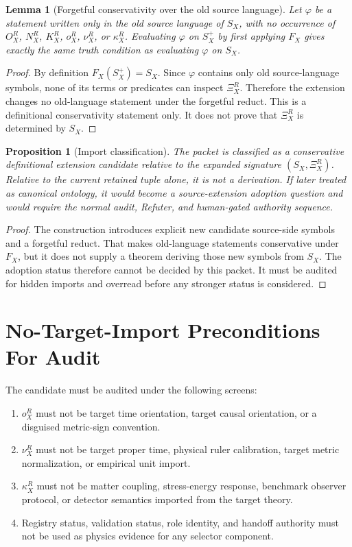 \documentclass[11pt]{article}
\newcommand{\XiR}{\Xi_X^R}
\newcommand{\SX}{S_X}
\newcommand{\Splus}{S_X^+}
\newtheorem{lemma}{Lemma}
\newtheorem{proposition}{Proposition}
\begin{document}
\begin{lemma}[Forgetful conservativity over the old source language]
Let \(\varphi\) be a statement written only in the old source language
of \(\SX\), with no occurrence of \(O_X^R\), \(N_X^R\), \(K_X^R\),
\(o_X^R\), \(\nu_X^R\), or \(\kappa_X^R\). Evaluating \(\varphi\) on
\(\Splus\) by first applying \(F_X\) gives exactly the same truth
condition as evaluating \(\varphi\) on \(\SX\).
\end{lemma}

\begin{proof}
By definition \(F_X(\Splus)=\SX\). Since \(\varphi\) contains only old
source-language symbols, none of its terms or predicates can inspect
\(\XiR\). Therefore the extension changes no old-language statement
under the forgetful reduct. This is a definitional conservativity
statement only. It does not prove that \(\XiR\) is determined by
\(\SX\).
\end{proof}

\begin{proposition}[Import classification]
The packet is classified as a conservative definitional extension
candidate relative to the expanded signature \((\SX,\XiR)\). Relative
to the current retained tuple alone, it is not a derivation. If later
treated as canonical ontology, it would become a source-extension
adoption question and would require the normal audit, Refuter, and
human-gated authority sequence.
\end{proposition}

\begin{proof}
The construction introduces explicit new candidate source-side symbols
and a forgetful reduct. That makes old-language statements conservative
under \(F_X\), but it does not supply a theorem deriving those new
symbols from \(\SX\). The adoption status therefore cannot be decided
by this packet. It must be audited for hidden imports and overread
before any stronger status is considered.
\end{proof}

\section{No-Target-Import Preconditions For Audit}

The candidate must be audited under the following screens:
\begin{enumerate}
  \item \(o_X^R\) must not be target time orientation, target causal
  orientation, or a disguised metric-sign convention.
  \item \(\nu_X^R\) must not be target proper time, physical ruler
  calibration, target metric normalization, or empirical unit import.
  \item \(\kappa_X^R\) must not be matter coupling, stress-energy
  response, benchmark observer protocol, or detector semantics imported
  from the target theory.
  \item Registry status, validation status, role identity, and handoff
  authority must not be used as physics evidence for any selector
  component.
\end{enumerate}
\end{document}
